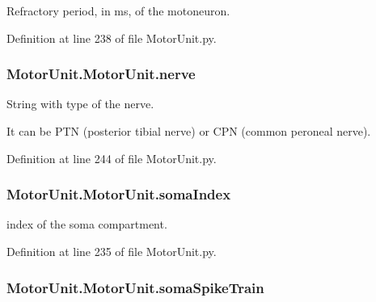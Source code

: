 Refractory period, in ms, of the motoneuron. 



Definition at line 238 of file Motor\+Unit.\+py.

\subsubsection[{\texorpdfstring{nerve}{nerve}}]{\setlength{\rightskip}{0pt plus 5cm}Motor\+Unit.\+Motor\+Unit.\+nerve}\hypertarget{class_motor_unit_1_1_motor_unit_a754ee6b88fc2a09899da9f9b13bfbf59}{}\label{class_motor_unit_1_1_motor_unit_a754ee6b88fc2a09899da9f9b13bfbf59}


String with type of the nerve. 

It can be P\+TN (posterior tibial nerve) or C\+PN (common peroneal nerve). 

Definition at line 244 of file Motor\+Unit.\+py.

\subsubsection[{\texorpdfstring{soma\+Index}{somaIndex}}]{\setlength{\rightskip}{0pt plus 5cm}Motor\+Unit.\+Motor\+Unit.\+soma\+Index}\hypertarget{class_motor_unit_1_1_motor_unit_a7cd2be92814b5892bdd18dafd824da9f}{}\label{class_motor_unit_1_1_motor_unit_a7cd2be92814b5892bdd18dafd824da9f}


index of the soma compartment. 



Definition at line 235 of file Motor\+Unit.\+py.

\subsubsection[{\texorpdfstring{soma\+Spike\+Train}{somaSpikeTrain}}]{\setlength{\rightskip}{0pt plus 5cm}Motor\+Unit.\+Motor\+Unit.\+soma\+Spike\+Train}\hypertarget{class_motor_unit_1_1_motor_unit_a8c86d98daa6c509e226ab165fa92515f}{}\label{class_motor_unit_1_1_motor_unit_a8c86d98daa6c509e226ab165fa92515f}


